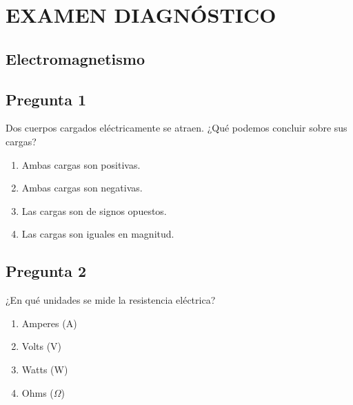 
\renewcommand{\tema}{Examen Diagnóstico — Electromagnetismo}

\section*{EXAMEN DIAGNÓSTICO}
\subsection*{Electromagnetismo}


\begin{preguntabox}
\subsection*{Pregunta 1}
Dos cuerpos cargados eléctricamente se atraen. ¿Qué podemos concluir sobre sus cargas?

\begin{enumerate}
    \item[A)] Ambas cargas son positivas.
    \item[B)] Ambas cargas son negativas.
    \item[C)] Las cargas son de signos opuestos.
    \item[D)] Las cargas son iguales en magnitud.
\end{enumerate}
\end{preguntabox}

\begin{preguntabox}
\subsection*{Pregunta 2}
¿En qué unidades se mide la resistencia eléctrica?

\begin{enumerate}
    \item[A)] Amperes (A)
    \item[B)] Volts (V)
    \item[C)] Watts (W)
    \item[D)] Ohms ($\Omega$)
\end{enumerate}
\end{preguntabox}

